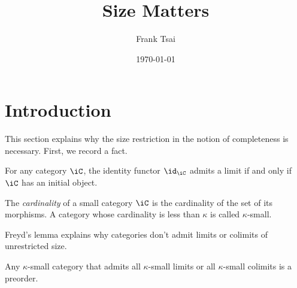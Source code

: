 \documentclass{amsart}
\title{Size Matters}
\author{Frank Tsai}
\date{\today}
\begin{document}
\maketitle
\tableofcontents

\section{Introduction}
\label{sec:introduction}

This section explains why the size restriction in the notion of completeness is necessary.
First, we record a fact.

\begin{lem}
  For any category $\iC$, the identity functor $\id_{\iC}$ admits a limit if and only if $\iC$ has an initial object.
\end{lem}

\begin{defn}
  The \emph{cardinality} of a small category $\iC$ is the cardinality of the set of its morphisms.
  A category whose cardinality is less than $\kappa$ is called $\kappa$-small.
\end{defn}

Freyd's lemma explains why categories don't admit limits or colimits of unrestricted size.

\begin{lem}
  Any $\kappa$-small category that admits all $\kappa$-small limits or all $\kappa$-small colimits is a preorder.
\end{lem}



\end{document}
